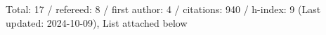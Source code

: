 Total: 17 / refereed: 8 / first author: 4 / citations: 940 / h-index: 9 (Last updated: 2024-10-09), List attached below